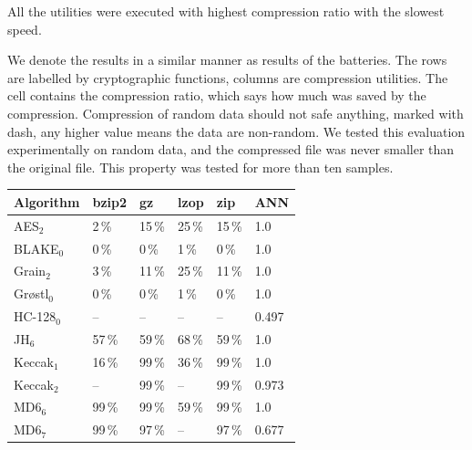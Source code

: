 \documentclass[
  print, %
  Table,   %
  nolof,     %
  nolot,     %
  11pt, %
  oneside  %
]{fithesis3}
\newcommand{\fd}{\cellcolor{myred!15}}
\newcommand{\fn}{\cellcolor{mygreen!20}}
\begin{document}
All the utilities were executed with highest compression ratio with the slowest speed.

We denote the results in a similar manner as results of the batteries. The rows are labelled by cryptographic functions, columns are compression utilities. The cell contains the compression ratio, which says how much was saved by the compression. Compression of random data should not safe anything, marked with dash, any higher value means the data are non-random. We tested this evaluation experimentally on random data, and the compressed file was never smaller than the original file. This property was tested for more than ten samples.

\begin{table}[H]
\centering

\begin{tabular}{@{}l|lllll}
\textbf{\large Algorithm} & 
\multicolumn{1}{R{1.1cm}}{\textbf{bzip2}} &
\multicolumn{1}{R{1.1cm}}{\textbf{gz}} &
\multicolumn{1}{R{1.1cm}}{\textbf{lzop}} &
\multicolumn{1}{R{1.1cm}}{\textbf{zip}} &
\multicolumn{1}{R{1.1cm}}{\textbf{ANN}} \\ \hline
AES$_{2}$                        & 2\,\%  \fd & 15\,\% \fd & 25\,\% \fd & 15\,\% \fd & 1.0   \fd \\ \hline
BLAKE$_{0}$                      & 0\,\%  \fd & 0\,\%  \fd & 1\,\%  \fd & 0\,\%  \fd & 1.0   \fd \\ \hline
Grain$_{2}$                      & 3\,\%  \fd & 11\,\% \fd & 25\,\% \fd & 11\,\% \fd & 1.0   \fd \\ \hline
Gr\o{}stl$_{0}$                  & 0\,\%  \fd & 0\,\%  \fd & 1\,\%  \fd & 0\,\%  \fd & 1.0   \fd \\ \hline
HC-128$_{0}$                     & --     \fn & --     \fn & --     \fn & --     \fn & 0.497 \fn \\ \hline
JH$_{6}$                         & 57\,\% \fd & 59\,\% \fd & 68\,\% \fd & 59\,\% \fd & 1.0   \fd \\ \hline
Keccak$_{1}$                     & 16\,\% \fd & 99\,\% \fd & 36\,\% \fd & 99\,\% \fd & 1.0   \fd \\
Keccak$_{2}$                     & --     \fn & 99\,\% \fd & --     \fn & 99\,\% \fd & 0.973 \fd \\ \hline
MD6$_{6}$                        & 99\,\% \fd & 99\,\% \fd & 59\,\% \fd & 99\,\% \fd & 1.0   \fd \\
MD6$_{7}$                        & 99\,\% \fd & 97\,\% \fd & --     \fn & 97\,\% \fd & 0.677 \fd \\ \hline

\end{tabular}
\end{table}
\end{document}
